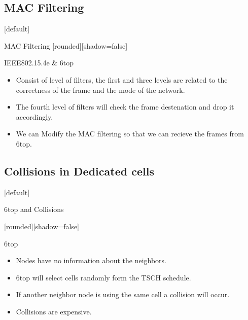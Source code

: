 \documentclass{beamer}
\makeatletter
\newenvironment{withoutheadline}{
        \setbeamertemplate{headline}[default]
        \def\beamer@entrycode{\vspace*{-\headheight}}
    }{}
\makeatother
\begin{document}
\subsection{MAC Filtering}
\begin{withoutheadline}
\begin{frame}{MAC Filtering}
[rounded][shadow=false]


  \begin{block}{IEEE802.15.4e \& 6top}
    \begin{itemize}
    \item Consist of level of filters, the first and three levels are related to the correctness of the frame and the mode of the network. 
    \item The fourth level of filters will check the frame destenation and drop it accordingly.
    \item We can Modify the MAC filtering so that we can recieve the frames from 6top. 
    
    
    \end{itemize}
    \end{block}
\end{frame}
\end{withoutheadline}



\subsection{Collisions in Dedicated cells}


  \begin{withoutheadline}
\begin{frame}{6top and Collisions}

[rounded][shadow=false]


\begin{block}{6top}

    \begin{itemize}
    \item Nodes have no information about the neighbors.
    \item 6top will select cells randomly form the TSCH schedule. 
    \item If another neighbor node is using the same cell a collision will occur. 
    \item Collisions are expensive.
    \end{itemize}
    \end{block}




\end{frame}
\end{withoutheadline}
\end{document}
